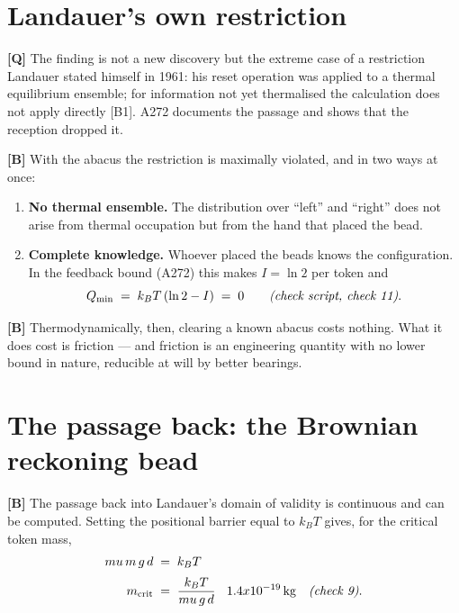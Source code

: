 \section{Landauer's own restriction}

\textbf{[Q]} The finding is not a new discovery but the extreme case of a restriction
Landauer stated himself in 1961: his reset operation was applied to a thermal
equilibrium ensemble; for information not yet thermalised the calculation does not
apply directly [B1]. A272 documents the passage and shows that the reception
dropped it.

\textbf{[B]} With the abacus the restriction is maximally violated, and in two ways at
once:

\begin{enumerate}[leftmargin=1.6em,itemsep=0.3em]
  \item \textbf{No thermal ensemble.} The distribution over “left” and “right”
        does not arise from thermal occupation but from the hand that placed the
        bead.
  \item \textbf{Complete knowledge.} Whoever placed the beads knows the
        configuration. In the feedback bound (A272) this makes $I = \ln 2$ per
        token and
        \begin{equation}
          Q_{\min} \;=\; k_B T\,(\ln 2 - I) \;=\; 0
          \qquad \text{\emph{(check script, check 11)}} .
        \end{equation}
\end{enumerate}

\textbf{[B]} Thermodynamically, then, clearing a known abacus costs nothing. What it does
cost is friction --- and friction is an engineering quantity with no lower bound
in nature, reducible at will by better bearings.

\section{The passage back: the Brownian reckoning bead}

\textbf{[B]} The passage back into Landauer's domain of validity is continuous and can be
computed. Setting the positional barrier equal to $k_BT$ gives, for the critical
token mass,
\begin{align}
  \mu\,m\,g\,d &\;=\; k_B T \notag\\[2pt]
  m_{\text{crit}} &\;=\; \frac{k_B T}{\mu\,g\,d} \;\approx\; 1.4\times10^{-19}\,\text{kg}
  \quad\text{\emph{(check 9)}}. \notag
\end{align}


